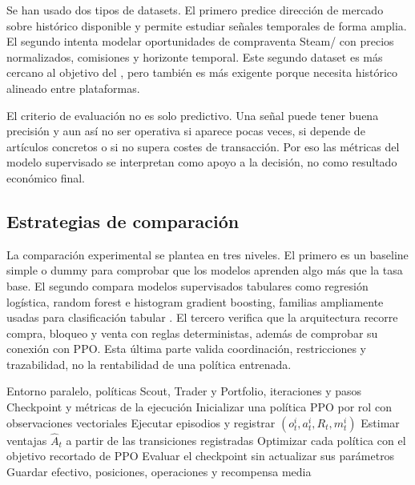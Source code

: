 Se han usado dos tipos de datasets. El primero predice dirección de mercado sobre histórico disponible y permite estudiar señales temporales de forma amplia. El segundo intenta modelar oportunidades de compraventa Steam/ con precios normalizados, comisiones y horizonte temporal. Este segundo dataset es más cercano al objetivo del , pero también es más exigente porque necesita histórico alineado entre plataformas.

El criterio de evaluación no es solo predictivo. Una señal puede tener buena precisión y aun así no ser operativa si aparece pocas veces, si depende de artículos concretos o si no supera costes de transacción. Por eso las métricas del modelo supervisado se interpretan como apoyo a la decisión, no como resultado económico final.

\subsection{Estrategias de comparación}

La comparación experimental se plantea en tres niveles. El primero es un baseline simple o dummy para comprobar que los modelos aprenden algo más que la tasa base. El segundo compara modelos supervisados tabulares como regresión logística, random forest e histogram gradient boosting, familias ampliamente usadas para clasificación tabular \cite{breiman2001random,friedman2001greedy}. El tercero verifica que la arquitectura  recorre compra, bloqueo y venta con reglas deterministas, además de comprobar su conexión con PPO. Esta última parte valida coordinación, restricciones y trazabilidad, no la rentabilidad de una política entrenada.

\begin{algorithm}[H]
\caption{Entrenamiento PPO}
\label{alg:entrenamiento-ppo}
\begin{algorithmic}[1]
\Require Entorno paralelo, políticas Scout, Trader y Portfolio, iteraciones y pasos
\Ensure Checkpoint y métricas de la ejecución
\State Inicializar una política PPO por rol con observaciones vectoriales
  \State Ejecutar episodios y registrar $(o_t^i,a_t^i,R_t,m_t^i)$
  \State Estimar ventajas $\widehat{A}_t$ a partir de las transiciones registradas
  \State Optimizar cada política con el objetivo recortado de PPO
\EndFor
\State Evaluar el checkpoint sin actualizar sus parámetros
\State Guardar efectivo, posiciones, operaciones y recompensa media
\end{algorithmic}
\end{algorithm}

